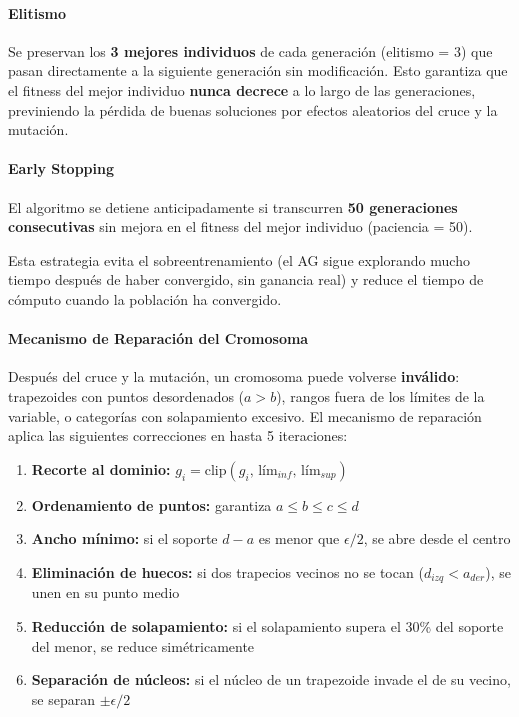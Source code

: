 \documentclass[11pt]{article}
\begin{document}
\paragraph{Elitismo}

Se preservan los \textbf{3 mejores individuos} de cada generaci\'on (elitismo = 3) que pasan directamente a la siguiente generaci\'on sin modificaci\'on. Esto garantiza que el fitness del mejor individuo \textbf{nunca decrece} a lo largo de las generaciones, previniendo la p\'erdida de buenas soluciones por efectos aleatorios del cruce y la mutaci\'on.

\paragraph{Early Stopping}

El algoritmo se detiene anticipadamente si transcurren \textbf{50 generaciones consecutivas} sin mejora en el fitness del mejor individuo (paciencia = 50).

Esta estrategia evita el sobreentrenamiento (el AG sigue explorando mucho tiempo despu\'es de haber convergido, sin ganancia real) y reduce el tiempo de c\'omputo cuando la poblaci\'on ha convergido.

\paragraph{Mecanismo de Reparación del Cromosoma}

Despu\'es del cruce y la mutaci\'on, un cromosoma puede volverse \textbf{inv\'alido}: trapezoides con puntos desordenados ($a > b$), rangos fuera de los l\'imites de la variable, o categor\'ias con solapamiento excesivo. El mecanismo de reparaci\'on aplica las siguientes correcciones en hasta 5 iteraciones:

\begin{enumerate}
    \item \textbf{Recorte al dominio:} $g_i = \text{clip}(g_i,\, \text{l\'im}_{inf},\, \text{l\'im}_{sup})$
    \item \textbf{Ordenamiento de puntos:} garantiza $a \leq b \leq c \leq d$
    \item \textbf{Ancho m\'inimo:} si el soporte $d - a$ es menor que $\epsilon/2$, se abre desde el centro
    \item \textbf{Eliminaci\'on de huecos:} si dos trapecios vecinos no se tocan ($d_{izq} < a_{der}$), se unen en su punto medio
    \item \textbf{Reducci\'on de solapamiento:} si el solapamiento supera el 30\% del soporte del menor, se reduce sim\'etricamente
    \item \textbf{Separaci\'on de n\'ucleos:} si el n\'ucleo de un trapezoide invade el de su vecino, se separan $\pm\epsilon/2$
\end{enumerate}
\end{document}
